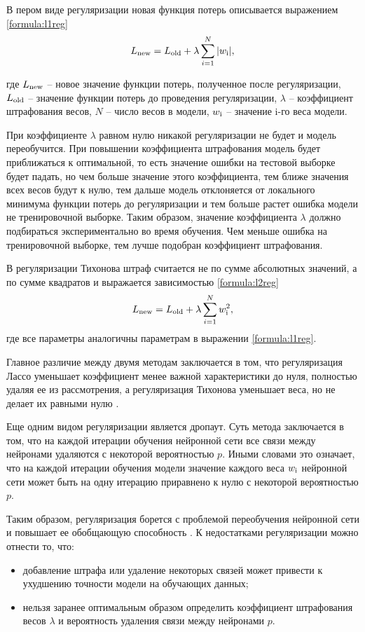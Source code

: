 В пером виде регуляризации новая функция потерь описывается выражением \ref{formula:l1reg}
\begin{equation}\label{formula:l1reg}
L_{\rm{new}} = L_{\rm{old}} + \lambda\sum\limits_{i=1}^{N}|w_{\rm{i}}|,
\end{equation}

где $L_{\rm{new}}$ -- новое значение функции потерь, полученное после регуляризации, $L_{\rm{old}}$ -- значение функции потерь до проведения регуляризации, $\lambda$ -- коэффициент штрафования весов, $N$ -- число весов в модели, $w_{\rm{i}}$ -- значение i-го веса модели.

При коэффициенте $\lambda$ равном нулю никакой регуляризации не будет и модель переобучится. При повышении коэффициента штрафования модель будет приближаться к оптимальной, то есть значение ошибки на тестовой выборке будет падать, но чем больше значение этого коэффициента, тем ближе значения всех весов будут к нулю, тем дальше модель отклоняется от локального минимума функции потерь до регуляризации и тем больше растет ошибка модели не тренировочной выборке. Таким образом, значение коэффициента $\lambda$ должно подбираться экспериментально во время обучения. Чем меньше ошибка на тренировочной выборке, тем лучше подобран коэффициент штрафования.

В регуляризации Тихонова штраф считается не по сумме абсолютных значений, а по сумме квадратов и выражается зависимостью \ref{formula:l2reg}
\begin{equation}\label{formula:l2reg}
L_{\rm{new}} = L_{\rm{old}} + \lambda\sum\limits_{i=1}^{N}w_{\rm{i}}^2,
\end{equation}
где все параметры аналогичны параметрам в выражении \ref{formula:l1reg}.

Главное различие между двумя методам заключается в том, что регуляризация Лассо уменьшает коэффициент менее важной характеристики до нуля, полностью удаляя ее из рассмотрения, а регуляризация Тихонова уменьшает веса, но не делает их равными нулю \cite{regulisation}.

Еще одним видом регуляризации является дропаут. Суть метода заключается в том, что на каждой итерации обучения нейронной сети все связи между нейронами удаляются с некоторой вероятностью $p$. Иными словами это означает, что на каждой итерации обучения модели значение каждого веса $w_{\rm{i}}$ нейронной сети может быть на одну итерацию приравнено к нулю с некоторой вероятностью $p$.

Таким образом, регуляризация борется с проблемой переобучения нейронной сети и повышает ее обобщающую способность \cite{regulisation}. К недостатками регуляризации можно отнести то, что:
\begin{itemize}
	\item добавление штрафа или удаление некоторых связей может привести к ухудшению точности модели на обучающих данных;
	\item нельзя заранее оптимальным образом определить коэффициент штрафования весов $\lambda$ и вероятность удаления связи между нейронами $p$.
\end{itemize}

